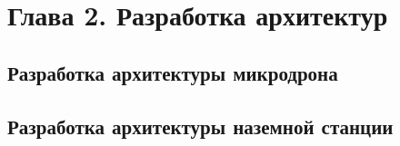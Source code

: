 
\section{Глава 2. Разработка архитектур}
\subsection{Разработка архитектуры микродрона}
\subsection{Разработка архитектуры наземной станции}